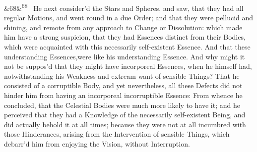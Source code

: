 \documentclass[12pt]{article}
\newcommand{\para}[1][]{\par\noindent\ifx&#1&\else\textsuperscript{\footnotesize #1}~\fi}
\begin{document}
\para[68] He next consider'd the Stars and Spheres, and saw, that they had all regular Motions, and went round in a due Order; and that they were pellucid and shining, and remote from any approach to Change or Dissolution: which made him have a strong suspicion, that they had Essences distinct from their Bodies, which were acquainted with this necessarily self-existent Essence. And that these understanding Essences,were like his understanding Essence. And why might it not be suppos'd that they might have incorporeal Essences, when he himself had, notwithstanding his Weakness and extream want of sensible Things? That he consisted of a corruptible Body, and yet nevertheless, all these Defects did not hinder him from having an incorporeal incorruptible Essence: From whence he concluded, that the Celestial Bodies were much more likely to have it; and he perceived that they had a Knowledge of the necessarily self-existent Being, and did actually behold it at all times; because they were not at all incumbred with those Hinderances, arising from the Intervention of sensible Things, which debarr'd him from enjoying the Vision, without Interruption.
\end{document}

